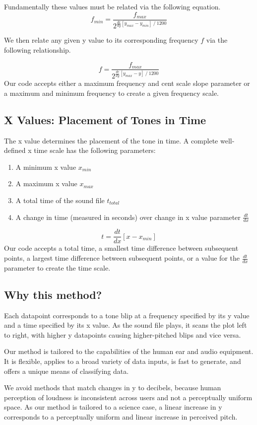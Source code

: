 \documentclass[]{acmsiggraph}
\begin{document}
Fundamentally these values must be related via the following equation.
$$ f_{min} = \frac{f_{max}}{2^{\frac{dc}{dy} [y_{max} - y_{min}] ~/~ 1200}} $$

We then relate any given y value to its corresponding frequency $f$ via the following relationship.

$$ f = \frac{f_{max}}{2^{\frac{dc}{dy} [y_{max} - y] ~/~ 1200}} $$
Our code accepts either a maximum frequency and cent scale slope parameter or a maximum and minimum frequency to create a given frequency scale.

\subsection{X Values: Placement of Tones in Time}

The x value determines the placement of the tone in time. A complete well-defined x time scale has the following parameters:

\begin{enumerate}
\item A minimum x value $x_{min}$
\item A maximum x value $x_{max}$
\item A total time of the sound file $t_{total}$
\item A change in time (measured in seconds) over change in x value parameter $\frac{dt}{dx}$
\end{enumerate}

$$ t = \frac{dt}{dx} [x - x_{min}]$$
Our code accepts a total time, a smallest time difference between subsequent points, a largest time difference between subsequent points, or a value for the  $\frac{dt}{dx}$ parameter to create the time scale.

\subsection{Why this method? }

Each datapoint corresponds to a tone blip at a frequency specified by its y value and a time specified by its x value. As the sound file plays, it scans the plot left to right, with higher y datapoints causing higher-pitched blips and vice versa.

Our method is tailored to the capabilities of the human ear and audio equipment. It is flexible, applies to a broad variety of data inputs, is fast to generate, and offers a unique means of classifying data.

We avoid methods that match changes in y to decibels, because human perception of loudness is inconsistent across users and not a perceptually uniform space. As our method is tailored to a science case, a linear increase in y corresponds to a perceptually uniform and linear increase in perceived pitch.
\end{document}
